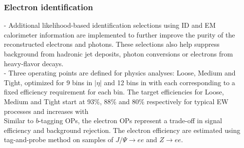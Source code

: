 \documentclass[../thesis.tex]{subfiles}
\begin{document}
\subsubsection*{Electron identification}
- Additional likelihood-based identification selections using ID and EM calorimeter information are implemented to further improve the purity of the reconstructed electrons and photons. These selections also help suppress background from hadronic jet deposits, photon conversions or electrons from heavy-flavor decays.\\
- Three operating points are defined for physics analyses: Loose, Medium and Tight, optimized for 9 bins in $|\eta|$ and 12 bins in \ET with each corresponding to a fixed efficiency requirement for each bin. The target efficiencies for Loose, Medium and Tight start at 93\%, 88\% and 80\% respectively for typical EW processes and increases with \ET \\ Similar to $b$-tagging OPs, the electron OPs represent a trade-off in signal efficiency and background rejection. The electron efficiency are estimated using tag-and-probe method \citep{reco:electron_id} on samples of $J/\Psi \rightarrow ee$ and $Z \rightarrow ee$.
\begin{figure}[!htbp]
\centering
{}
\caption{\label{fig:reco:electron_eff}\citep{reco:electron_meas}}
\end{figure}
\end{document}
